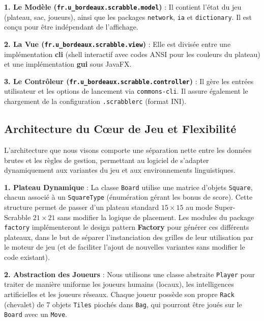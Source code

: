 \documentclass[a4paper]{article}
\begin{document}
\hangindent=1.5cm
\textbf{1. Le Modèle (\texttt{fr.u\_bordeaux.scrabble.model})} : Il contient l’état du jeu (plateau, sac, joueurs), ainsi que les packages \texttt{network}, \texttt{ia} et \texttt{dictionary}. Il est conçu pour être indépendant de l'affichage.

\vspace{1\baselineskip}
\hangindent=1.5cm
\textbf{2. La Vue (\texttt{fr.u\_bordeaux.scrabble.view})} : Elle est divisée entre une implémentation \textbf{cli} (shell interactif avec codes ANSI pour les couleurs du plateau) et une implémentation \textbf{gui} sous JavaFX.

\vspace{1\baselineskip}
\hangindent=1.5cm
\textbf{3. Le Contrôleur (\texttt{fr.u\_bordeaux.scrabble.controller})} : Il gère les entrées utilisateur et les options de lancement via \texttt{commons-cli}. Il assure également le chargement de la configuration \texttt{.scrabblerc} (format INI).

\subsection{Architecture du Cœur de Jeu et Flexibilité}
\hangindent=0.8mm
L'architecture que nous visons comporte une séparation nette entre les données brutes et les règles de gestion, permettant au logiciel de s'adapter dynamiquement aux variantes du jeu et aux environnements linguistiques.

\hangindent=1.5cm
\textbf{1. Plateau Dynamique} : La classe \texttt{Board} utilise une matrice d'objets \texttt{Square}, chacun associé à un \texttt{SquareType} (énumération gérant les bonus de score). Cette structure permet de passer d'un plateau standard $15\times15$ au mode Super-Scrabble $21\times21$ sans modifier la logique de placement. Les modules du package \texttt{factory} implémenteront le design pattern \textbf{Factory} pour générer ces différents plateaux, dans le but de séparer l'instanciation des grilles de leur utilisation par le moteur de jeu (et de faciliter l'ajout de nouvelles variantes sans modifier le code existant).

\vspace{1\baselineskip}
\hangindent=1.5cm
\textbf{2. Abstraction des Joueurs} : Nous utilisons une classe abstraite \texttt{Player} pour traiter de manière uniforme les joueurs humains (locaux), les intelligences artificielles et les joueurs réseaux. Chaque joueur possède son propre \texttt{Rack} (chevalet) de 7 objets \texttt{Tiles} piochés dans \texttt{Bag}, qui pourront être joués sur le \texttt{Board} avec un \texttt{Move}.
\end{document}
